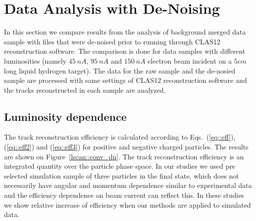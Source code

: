 \section{Data Analysis with De-Noising}

In this section we compare results from the analysis of background merged data sample with files that were de-noised prior to running through CLAS12 reconstruction software. The comparison is done for data samples with different luminosities (namely $45~nA$, $95~nA$ and $150~nA$ electron beam incident on a $5cm$ long liquid hydrogen target). The data for the raw sample and the de-nosied sample are processed with same settings of CLAS12 reconstruction software and the tracks reconstructed in each sample are analyzed.

\subsection{Luminosity dependence}

The track reconstruction efficiency is calculated according to Eqs.~(\ref{eq::eff}), (\ref{eq::eff2}) and (\ref{eq::eff3}) for positive and negative charged particles. The results are shown on Figure~\ref{lscan::conv_dn}. The track reconstruction efficiency is an integrated quantity over the particle phase space. In our studies we used pre selected simulation sample of three particles in the final state, which does not necessarily have angular and momentum dependence similar to experimental data and the efficiency dependence on beam current can reflect this. In these studies we show relative increase of efficiency when our methods are applied to simulated data.

